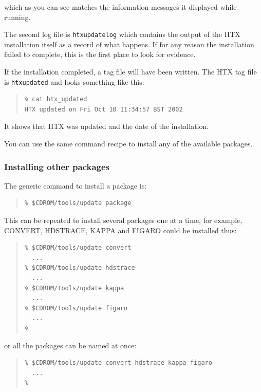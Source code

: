 \documentclass[twoside,11pt]{article}
\renewcommand{\_}{\texttt{\symbol{95}}}
\begin{document}
which as you can see matches the information messages it displayed while
running.

The second log file is \texttt{htx\_update\_log} which contains the output
of the HTX installation itself as a record of what happens.  If for any
reason the installation failed to complete, this is the first place to
look for evidence.

If the installation completed, a tag file will have been written.  The
HTX tag file is \texttt{htx\_updated} and looks something like this:

\begin{quote}
\begin{verbatim}
% cat htx_updated
HTX updated on Fri Oct 10 11:34:57 BST 2002
\end{verbatim}
\end{quote}

It shows that HTX was updated and the date of the installation.

You can use the same command recipe to install any of the available
packages.

\subsubsection{Installing other packages}

The generic command to install a package is:

\begin{quote}
\begin{verbatim}
% $CDROM/tools/update package
\end{verbatim}
\end{quote}

This can be repeated to install several packages one at a time, for
example, CONVERT, HDSTRACE, KAPPA  and FIGARO could be installed thus:

\begin{quote}
\begin{verbatim}
% $CDROM/tools/update convert
  ...
% $CDROM/tools/update hdstrace
  ...
% $CDROM/tools/update kappa
  ...
% $CDROM/tools/update figaro
  ...
%
\end{verbatim}
\end{quote}

or all the packages can be named at once:

\begin{quote}
\begin{verbatim}
% $CDROM/tools/update convert hdstrace kappa figaro
  ...
%
\end{verbatim}
\end{quote}
\end{document}
